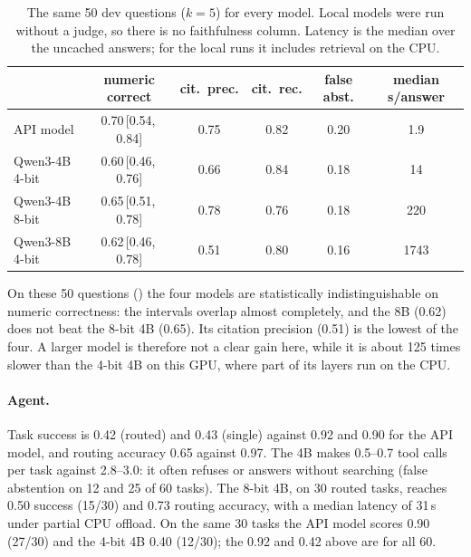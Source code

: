 \documentclass[10pt,a4paper]{article}
\newcommand{\ci}[2]{\,[#1,\,#2]}
\begin{document}
\begin{table}[t]\centering\small
\caption{The same 50 dev questions ($k=5$) for every model. Local models were run without a judge, so there is no
faithfulness column. Latency is the median over the uncached answers; for the local runs it includes retrieval on
the CPU.}\label{tab:half}
\begin{tabular}{lccccc}\toprule
 & numeric correct & cit.\ prec. & cit.\ rec. & false abst. & median s/answer \\\midrule
API model & 0.70\ci{0.54}{0.84} & 0.75 & 0.82 & 0.20 & 1.9 \\
Qwen3-4B 4-bit & 0.60\ci{0.46}{0.76} & 0.66 & 0.84 & 0.18 & 14 \\
Qwen3-4B 8-bit & 0.65\ci{0.51}{0.78} & 0.78 & 0.76 & 0.18 & 220 \\
Qwen3-8B 4-bit & 0.62\ci{0.46}{0.78} & 0.51 & 0.80 & 0.16 & 1743 \\\bottomrule
\end{tabular}
\end{table}
On these 50 questions () the four models are statistically indistinguishable on numeric correctness: the
intervals overlap almost completely, and the 8B (0.62) does not beat the 8-bit 4B (0.65). Its citation precision
(0.51) is the lowest of the four. A larger model is therefore not a clear gain here, while it is about 125 times slower than the
4-bit 4B on this GPU, where part of its layers run on the CPU.

\paragraph{Agent.} Task success is 0.42 (routed) and 0.43 (single) against 0.92 and 0.90 for the API model, and
routing accuracy 0.65 against 0.97. The 4B makes 0.5--0.7 tool calls per task against 2.8--3.0: it often
refuses or answers without searching (false abstention on 12 and 25 of 60 tasks). The 8-bit 4B, on 30 routed
tasks, reaches 0.50 success (15/30) and 0.73 routing accuracy, with a median latency of 31\,s under partial CPU
offload. On the same 30 tasks the API model scores 0.90 (27/30) and the 4-bit 4B 0.40 (12/30); the 0.92 and 0.42
above are for all 60.
\end{document}
